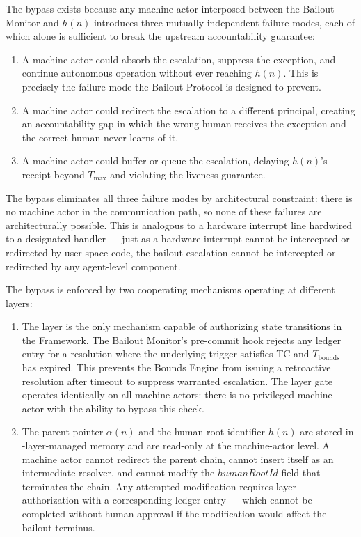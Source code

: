 The bypass exists because any machine actor interposed between the Bailout Monitor and $h(n)$ introduces three mutually independent failure modes, each of which alone is sufficient to break the upstream accountability guarantee:

\begin{enumerate}
\item[\textbf{Intercept.}] A machine actor could absorb the escalation, suppress the exception, and continue autonomous operation without ever reaching $h(n)$. This is precisely the failure mode the Bailout Protocol is designed to prevent.

\item[\textbf{Redirect.}] A machine actor could redirect the escalation to a different principal, creating an accountability gap in which the wrong human receives the exception and the correct human never learns of it.

\item[\textbf{Delay.}] A machine actor could buffer or queue the escalation, delaying $h(n)$'s receipt beyond $T_{\text{max}}$ and violating the liveness guarantee.
\end{enumerate}

The bypass eliminates all three failure modes by architectural constraint: there is no machine actor in the communication path, so none of these failures are architecturally possible. This is analogous to a hardware interrupt line hardwired to a designated handler — just as a hardware interrupt cannot be intercepted or redirected by user-space code, the bailout escalation cannot be intercepted or redirected by any agent-level component.

The bypass is enforced by two cooperating mechanisms operating at different layers:

\begin{enumerate}
\item[\textbf{Fact Layer gate.}] The \fact{} layer is the only mechanism capable of authorizing state transitions in the \bxthree{} Framework. The Bailout Monitor's pre-commit hook rejects any ledger entry for a resolution where the underlying trigger satisfies TC and $T_{\text{bounds}}$ has expired. This prevents the Bounds Engine from issuing a retroactive resolution after timeout to suppress warranted escalation. The \fact{} layer gate operates identically on all machine actors: there is no privileged machine actor with the ability to bypass this check.

\item[\textbf{Immutable parent-pointer and human-root architecture.}] The parent pointer $\alpha(n)$ and the human-root identifier $h(n)$ are stored in \fact-layer-managed memory and are read-only at the machine-actor level. A machine actor cannot redirect the parent chain, cannot insert itself as an intermediate resolver, and cannot modify the $humanRootId$ field that terminates the chain. Any attempted modification requires \purpose{} layer authorization with a corresponding ledger entry — which cannot be completed without human approval if the modification would affect the bailout terminus.
\end{enumerate}

